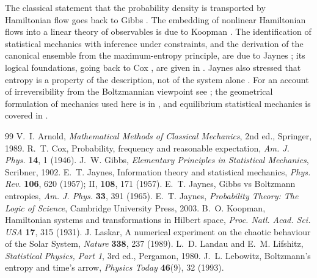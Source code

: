 The classical statement that the probability density is transported by Hamiltonian flow goes back to Gibbs \cite{Gibbs1902}. The embedding of nonlinear Hamiltonian flows into a linear theory of observables is due to Koopman \cite{Koopman1931}. The identification of statistical mechanics with inference under constraints, and the derivation of the canonical ensemble from the maximum-entropy principle, are due to Jaynes \cite{Jaynes1957}; its logical foundations, going back to Cox \cite{Cox1946}, are given in \cite{Jaynes2003}. Jaynes also stressed that entropy is a property of the description, not of the system alone \cite{Jaynes1965}. For an account of irreversibility from the Boltzmannian viewpoint see \cite{Lebowitz1993}; the geometrical formulation of mechanics used here is in \cite{Arnold1989}, and equilibrium statistical mechanics is covered in \cite{LandauLifshitz}.

\begin{thebibliography}{99}
 V.~I. Arnold, \emph{Mathematical Methods of Classical Mechanics}, 2nd ed., Springer, 1989.
 R.~T. Cox, Probability, frequency and reasonable expectation, \emph{Am. J. Phys.} \textbf{14}, 1 (1946).
 J.~W. Gibbs, \emph{Elementary Principles in Statistical Mechanics}, Scribner, 1902.
 E.~T. Jaynes, Information theory and statistical mechanics, \emph{Phys. Rev.} \textbf{106}, 620 (1957); II, \textbf{108}, 171 (1957).
 E.~T. Jaynes, Gibbs vs Boltzmann entropies, \emph{Am. J. Phys.} \textbf{33}, 391 (1965).
 E.~T. Jaynes, \emph{Probability Theory: The Logic of Science}, Cambridge University Press, 2003.
 B.~O. Koopman, Hamiltonian systems and transformations in Hilbert space, \emph{Proc. Natl. Acad. Sci. USA} \textbf{17}, 315 (1931).
 J. Laskar, A numerical experiment on the chaotic behaviour of the Solar System, \emph{Nature} \textbf{338}, 237 (1989).
 L.~D. Landau and E.~M. Lifshitz, \emph{Statistical Physics, Part 1}, 3rd ed., Pergamon, 1980.
 J.~L. Lebowitz, Boltzmann's entropy and time's arrow, \emph{Physics Today} \textbf{46}(9), 32 (1993).
\end{thebibliography}


